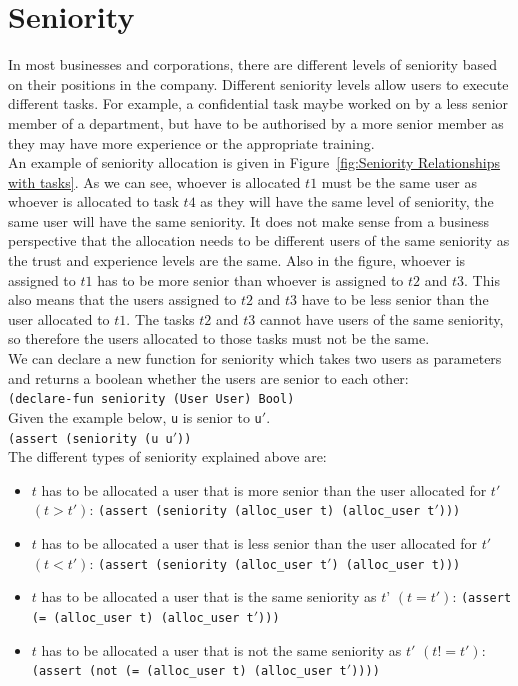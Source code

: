 \documentclass[a4paper]{report}
\begin{document}
\section{Seniority}
In most businesses and corporations, there are different levels of seniority based on their positions in the company. Different seniority levels allow users to execute different tasks. For example, a confidential task maybe worked on by a less senior member of a department, but have to be authorised by a more senior member as they may have more experience or the appropriate training.\\
An example of seniority allocation is given in Figure~\ref{fig:Seniority Relationships with tasks}. As we can see, whoever is allocated $t1$ must be the same user as whoever is allocated to task $t4$ as they will have the same level of seniority, the same user will have the same seniority. It does not make sense from a business perspective that the allocation needs to be different users of the same seniority as the trust and experience levels are the same. Also in the figure, whoever is assigned to $t1$ has to be more senior than whoever is assigned to $t2$ and $t3$. This also means that the users assigned to $t2$ and $t3$ have to be less senior than the user allocated to $t1$. The tasks $t2$ and $t3$ cannot have users of the same seniority, so therefore the users allocated to those tasks must not be the same.\\
We can declare a new function for seniority which takes two users as parameters and returns a boolean whether the users are senior to each other:\\
\texttt{(declare-fun seniority (User User) Bool)}\\
Given the example below, \texttt{u} is senior to \texttt{u\ensuremath{'}}.\\
\texttt{(assert (seniority (u u\ensuremath{'}))}\\
The different types of seniority explained above are:
\begin{itemize}
\item $t$ has to be allocated a user that is more senior than the user allocated for $t\ensuremath{'}$ $(t > t\ensuremath{'})$: \texttt{(assert (seniority (alloc\_user t) (alloc\_user t\ensuremath{'})))}
\item $t$ has to be allocated a user that is less senior than the user allocated for $t\ensuremath{'}$ $(t < t\ensuremath{'})$: \texttt{(assert (seniority (alloc\_user t\ensuremath{'}) (alloc\_user t)))}
\item $t$ has to be allocated a user that is the same seniority as $t’$ $(t = t\ensuremath{'})$: \texttt{(assert (= (alloc\_user t) (alloc\_user t\ensuremath{'})))}
\item $t$ has to be allocated a user that is not the same seniority as $t\ensuremath{'}$ $(t != t\ensuremath{'})$: \texttt{(assert (not (= (alloc\_user t) (alloc\_user t\ensuremath{'}))))}
\end{itemize}
\end{document}
